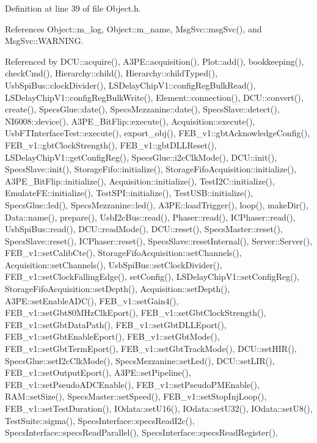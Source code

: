 Definition at line 39 of file Object.\+h.



References Object\+::m\+\_\+log, Object\+::m\+\_\+name, Msg\+Svc\+::msg\+Svc(), and Msg\+Svc\+::\+W\+A\+R\+N\+I\+NG.



Referenced by D\+C\+U\+::acquire(), A3\+P\+E\+::acquisition(), Plot\+::add(), bookkeeping(), check\+Cmd(), Hierarchy\+::child(), Hierarchy\+::child\+Typed(), Usb\+Spi\+Bus\+::clock\+Divider(), L\+S\+Delay\+Chip\+V1\+::config\+Reg\+Bulk\+Read(), L\+S\+Delay\+Chip\+V1\+::config\+Reg\+Bulk\+Write(), Element\+::connection(), D\+C\+U\+::convert(), create(), Specs\+Glue\+::date(), Specs\+Mezzanine\+::date(), Specs\+Slave\+::detect(), N\+I6008\+::device(), A3\+P\+E\+\_\+\+Bit\+Flip\+::execute(), Acquisition\+::execute(), Usb\+F\+T\+Interface\+Test\+::execute(), export\+\_\+obj(), F\+E\+B\+\_\+v1\+::gbt\+Acknowledge\+Config(), F\+E\+B\+\_\+v1\+::gbt\+Clock\+Strength(), F\+E\+B\+\_\+v1\+::gbt\+D\+L\+L\+Reset(), L\+S\+Delay\+Chip\+V1\+::get\+Config\+Reg(), Specs\+Glue\+::i2c\+Clk\+Mode(), D\+C\+U\+::init(), Specs\+Slave\+::init(), Storage\+Fifo\+::initialize(), Storage\+Fifo\+Acquisition\+::initialize(), A3\+P\+E\+\_\+\+Bit\+Flip\+::initialize(), Acquisition\+::initialize(), Test\+I2\+C\+::initialize(), Emulate\+F\+E\+::initialize(), Test\+S\+P\+I\+::initialize(), Test\+U\+S\+B\+::initialize(), Specs\+Glue\+::led(), Specs\+Mezzanine\+::led(), A3\+P\+E\+::load\+Trigger(), loop(), make\+Dir(), Data\+::name(), prepare(), Usb\+I2c\+Bus\+::read(), Phaser\+::read(), I\+C\+Phaser\+::read(), Usb\+Spi\+Bus\+::read(), D\+C\+U\+::read\+Mode(), D\+C\+U\+::reset(), Specs\+Master\+::reset(), Specs\+Slave\+::reset(), I\+C\+Phaser\+::reset(), Specs\+Slave\+::reset\+Internal(), Server\+::\+Server(), F\+E\+B\+\_\+v1\+::set\+Calib\+Cte(), Storage\+Fifo\+Acquisition\+::set\+Channels(), Acquisition\+::set\+Channels(), Usb\+Spi\+Bus\+::set\+Clock\+Divider(), F\+E\+B\+\_\+v1\+::set\+Clock\+Falling\+Edge(), set\+Config(), L\+S\+Delay\+Chip\+V1\+::set\+Config\+Reg(), Storage\+Fifo\+Acquisition\+::set\+Depth(), Acquisition\+::set\+Depth(), A3\+P\+E\+::set\+Enable\+A\+D\+C(), F\+E\+B\+\_\+v1\+::set\+Gain4(), F\+E\+B\+\_\+v1\+::set\+Gbt80\+M\+Hz\+Clk\+Eport(), F\+E\+B\+\_\+v1\+::set\+Gbt\+Clock\+Strength(), F\+E\+B\+\_\+v1\+::set\+Gbt\+Data\+Path(), F\+E\+B\+\_\+v1\+::set\+Gbt\+D\+L\+L\+Eport(), F\+E\+B\+\_\+v1\+::set\+Gbt\+Enable\+Eport(), F\+E\+B\+\_\+v1\+::set\+Gbt\+Mode(), F\+E\+B\+\_\+v1\+::set\+Gbt\+Term\+Eport(), F\+E\+B\+\_\+v1\+::set\+Gbt\+Track\+Mode(), D\+C\+U\+::set\+H\+I\+R(), Specs\+Glue\+::set\+I2c\+Clk\+Mode(), Specs\+Mezzanine\+::set\+Led(), D\+C\+U\+::set\+L\+I\+R(), F\+E\+B\+\_\+v1\+::set\+Output\+Eport(), A3\+P\+E\+::set\+Pipeline(), F\+E\+B\+\_\+v1\+::set\+Pseudo\+A\+D\+C\+Enable(), F\+E\+B\+\_\+v1\+::set\+Pseudo\+P\+M\+Enable(), R\+A\+M\+::set\+Size(), Specs\+Master\+::set\+Speed(), F\+E\+B\+\_\+v1\+::set\+Stop\+Inj\+Loop(), F\+E\+B\+\_\+v1\+::set\+Test\+Duration(), I\+Odata\+::set\+U16(), I\+Odata\+::set\+U32(), I\+Odata\+::set\+U8(), Test\+Suite\+::sigma(), Specs\+Interface\+::specs\+Read\+I2c(), Specs\+Interface\+::specs\+Read\+Parallel(), Specs\+Interface\+::specs\+Read\+Register(), 